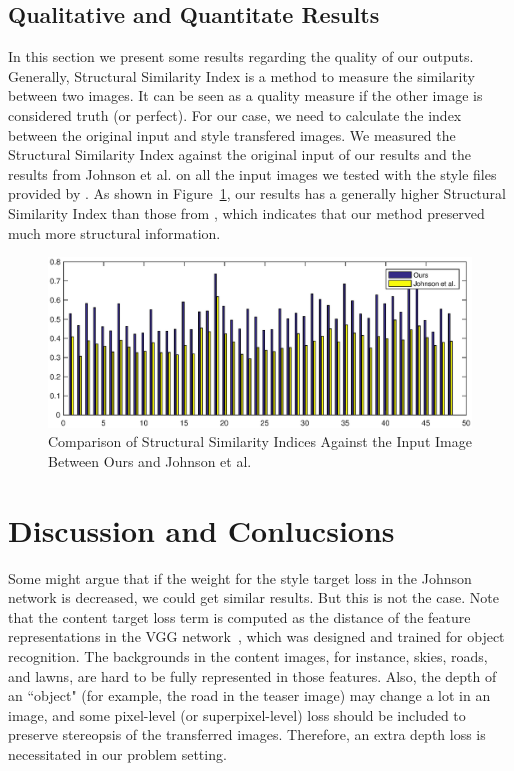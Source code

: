 \documentclass[10pt,twocolumn,letterpaper]{article}
\begin{document}
\subsection{Qualitative and Quantitate Results}
In this section we present some results regarding the quality of our outputs. Generally, Structural Similarity Index is a method to measure the similarity between two images. It can be seen as a quality measure if the other image is considered truth (or perfect). For our case, we need to calculate the index between the original input and style transfered images. We measured the Structural Similarity Index against the original input of our results and the results from Johnson et al. \cite{johnson2016perceptual} on all the input images we tested with the style files provided by \cite{johnson2016perceptual}.
As shown in Figure~\ref{fig:ssim}, our results has a generally higher Structural Similarity Index than those from \cite{johnson2016perceptual}, which indicates that our method preserved much more structural information.

\begin{figure}
\centering
\includegraphics[scale=0.7]{ssim.eps}
\caption{Comparison of Structural Similarity Indices Against the Input Image Between Ours and Johnson et al. \cite{johnson2016perceptual}}
\label{fig:ssim}
\end{figure}

\section{Discussion and Conlucsions}

Some might argue that if the weight for the style target loss in the Johnson \etal~\cite{johnson2016perceptual} network is decreased, we could get similar results. But this is not the case. Note that the content target loss term is computed as the distance of the feature representations in the VGG network~\cite{simonyan2014very}, which was designed and trained for object recognition. The backgrounds in the content images, for instance, skies, roads, and lawns, are hard to be fully represented in those features. Also, the depth of an ``object" (for example, the road in the teaser image) may change a lot in an image, and some pixel-level (or superpixel-level) loss should be included to preserve stereopsis of the transferred images. Therefore, an extra depth loss is necessitated in our problem setting.  
\end{document}
